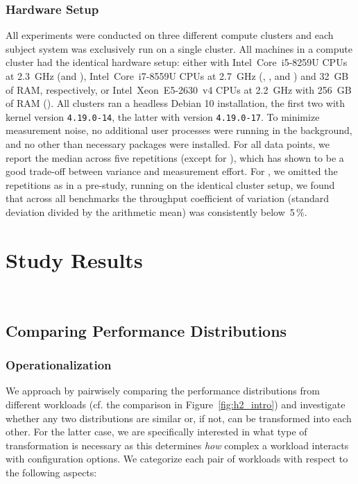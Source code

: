 \subsubsection{Hardware Setup}
All experiments were conducted on three different compute clusters and each subject system was exclusively run on a single cluster. All machines in a compute cluster had the identical hardware setup: either with Intel~Core~i5-8259U CPUs at 2.3~GHz (\jumper and \kanzi),  Intel~Core~i7-8559U CPUs at 2.7~GHz (\dconvert, \batik, and \jadx) and 32~GB of RAM, respectively, or Intel~Xeon~E5-2630~v4 CPUs at 2.2~GHz with 256~GB of RAM (\htwo). All clusters ran a headless Debian 10 installation, the first two with kernel version \mbox{\texttt{4.19.0-14}}, the latter with version \mbox{\texttt{4.19.0-17}}. 
To minimize measurement noise, no additional user processes were running in the background, and no other than necessary packages were installed.	For all data points, we report the median across five repetitions (except for \htwo), which has shown to be a good trade-off between variance and measurement effort. For \htwo, we omitted the repetitions as in a pre-study, running on the identical cluster setup, we found that across all benchmarks the throughput coefficient of variation (standard deviation divided by the arithmetic mean) was consistently below~5\,\%.

\section{Study Results}~\label{sec:results}
~
\subsection{Comparing Performance Distributions}\label{sec:rq1}
\subsubsection{Operationalization}
We approach  by pairwisely comparing the performance distributions from different workloads (cf. the comparison in Figure~\ref{fig:h2_intro}) and investigate whether any two distributions are similar or, if not, can be transformed into each other. For the latter case, we are specifically interested in what type of transformation is necessary as this determines \textit{how} complex a workload interacts with configuration options. We categorize each pair of workloads with respect to the following aspects: 

